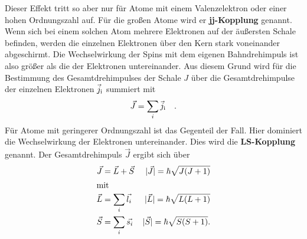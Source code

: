 \noindent
Dieser Effekt tritt so aber nur für Atome mit einem Valenzelektron oder einer hohen Ordnungszahl auf. Für die großen Atome wird er \textbf{jj-Kopplung} genannt. 
Wenn sich bei einem solchen Atom mehrere Elektronen auf der äußersten Schale befinden, werden die einzelnen Elektronen über den Kern stark voneinander abgeschirmt.
Die Wechselwirkung der Spins mit dem eigenen Bahndrehimpuls ist also größer als die der Elektronen untereinander.
Aus diesem Grund wird für die Bestimmung des Gesamtdrehimpulses der Schale $J$ über die Gesamtdrehimpulse der einzelnen Elektronen $\vec j_{\text{i}}$ summiert mit 
\begin{equation*}
    \vec J = \sum_i \vec j_{\text{i}} \quad.
\end{equation*}
Für Atome mit geringerer Ordnungszahl ist das Gegenteil der Fall. Hier dominiert die Wechselwirkung der Elektronen untereinander. 
Dies wird die \textbf{LS-Kopplung} genannt. Der Gesamtdrehimpuls $\vec J $ ergibt sich über 
\begin{align}
    \vec{J} &= \vec{L} + \vec{S} & |\vec{J}| = \hbar \sqrt{J(J+1)}\\
    \intertext{mit}
    \vec{L} &= \sum_i \vec{l_i}  & |\vec{L}| = \hbar \sqrt{L(L+1)}\\
    \vec{S} &= \sum_i \vec{s_i}  & |\vec{S}| = \hbar \sqrt{S(S+1)}.
\end{align}\\

